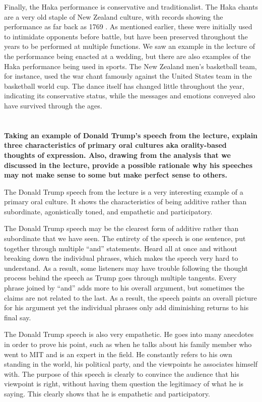 \documentclass[a4paper]{article}
\begin{document}
        Finally, the Haka performance is conservative and traditionalist. The Haka chants are a 
        very old staple of New Zealand culture, with records showing the performance as far back as 
        1769 \citep{timoti1993}. As mentioned earlier, these were initially used to intimidate opponents
        before battle, but have been preserved throughout the years to be performed at multiple 
        functions. We saw an example in the lecture of the performance being enacted at a wedding, 
        but there are also examples of the Haka performance being used in sports. The New Zealand 
        men’s basketball team, for instance, used the war chant famously against the United States 
        team in the basketball world cup. The dance itself has changed little throughout the year,
        indicating its conservative status, while the messages and emotions conveyed also have 
        survived through the ages. 

    \section{}
        \textbf{Taking an example of Donald Trump's speech from the lecture, explain three characteristics of primary oral cultures aka orality-based thoughts of expression. Also, drawing from the analysis that we discussed in the lecture, provide a possible rationale why his speeches may not make sense to some but make perfect sense to others.}
        
        The Donald Trump speech from the lecture is a very interesting example of a primary oral culture. It shows the characteristics of being additive rather than subordinate, agonistically toned, and empathetic and participatory. 

        The Donald Trump speech may be the clearest form of additive rather than subordinate that we have seen. The entirety of the speech is one sentence, put together through multiple “and” statements. Heard all at once and without breaking down the individual phrases, which makes the speech very hard to understand. As a result, some listeners may have trouble following the thought process behind the speech as Trump goes through multiple tangents. Every phrase joined by “and” adds more to his overall argument, but sometimes the claims are not related to the last. As a result, the speech paints an overall picture for his argument yet the individual phrases only add diminishing returns to his final say. 

        The Donald Trump speech is also very empathetic. He goes into many anecdotes in order to prove his point, such as when he talks about his family member who went to MIT and is an expert in the field. He constantly refers to his own standing in the world, his political party, and the viewpoints he associates himself with. The purpose of this speech is clearly to convince the audience that his viewpoint is right, without having them question the legitimacy of what he is saying. This clearly shows that he is empathetic and participatory. 
\end{document}

